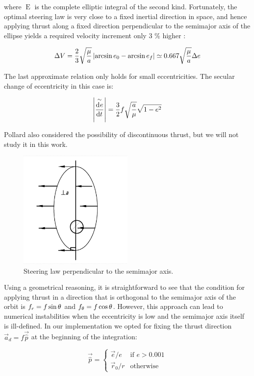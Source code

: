 where $\operatorname{E}$ is the complete elliptic integral of the second kind. Fortunately, the optimal steering law is very close to a fixed inertial direction in space, and hence applying thrust along a fixed direction perpendicular to the semimajor axis of the ellipse yields a required velocity increment only 3 \% higher \cite{pollard1997simplified}:

\[
\Delta V = \frac{2}{3} \sqrt{\frac{\mu}{a}} \left| \arcsin{e_0} - \arcsin{e_f} \right| \simeq 0.667 \sqrt{\frac{\mu}{a}} \Delta e
\]

The last approximate relation only holds for small eccentricities. The secular change of eccentricity in this case is:

\[
\left| \overset{\sim}{\frac{\operatorname{d}\!^{} e}{\operatorname{d}\! t^{}}} \right| = \frac{3}{2} f \sqrt{\frac{a}{\mu}} \sqrt{1 - e^2}
\]

Pollard also considered the possibility of discontinuous thrust, but we will not study it in this work.

\begin{figure}%
  \centering
  \includegraphics[width=0.5\textwidth]{figures/fixed-perpendicular.png}
  \caption{Steering law perpendicular to the semimajor axis.}
  \label{fig:perpendicular}
\end{figure}

Using a geometrical reasoning, it is straightforward to see that the condition for applying thrust in a direction that is orthogonal to the semimajor axis of the orbit is $f_r = f \sin{\ensuremath{\theta}}$ and $f_{\theta} = f \cos{\ensuremath{\theta}}$. However, this approach can lead to numerical instabilities when the eccentricity is low and the semimajor axis itself is ill-defined. In our implementation we opted for fixing the thrust direction $\vec{a}_d = f \vec{\hat{p}}$ at the beginning of the integration: %

\[ \vec{\hat{p}} = \begin{cases}
\vec{e} / e   & \text{if } e > 0.001 \\
\vec{r}_0 / r & \text{otherwise}
\end{cases}
\]

